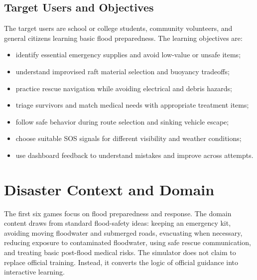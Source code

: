 \documentclass[11pt,a4paper]{article}
\newcommand{\sectionline}{\vspace{0.2em}{\color{ReportBlue}\hrule height 0.8pt}\vspace{0.6em}}
\begin{document}
\subsection{Target Users and Objectives}
The target users are school or college students, community volunteers, and general citizens learning basic flood preparedness. The learning objectives are:
\begin{itemize}
  \item identify essential emergency supplies and avoid low-value or unsafe items;
  \item understand improvised raft material selection and buoyancy tradeoffs;
  \item practice rescue navigation while avoiding electrical and debris hazards;
  \item triage survivors and match medical needs with appropriate treatment items;
  \item follow safe behavior during route selection and sinking vehicle escape;
  \item choose suitable SOS signals for different visibility and weather conditions;
  \item use dashboard feedback to understand mistakes and improve across attempts.
\end{itemize}

\section{Disaster Context and Domain}
\sectionline
The first six games focus on flood preparedness and response. The domain content draws from standard flood-safety ideas: keeping an emergency kit, avoiding moving floodwater and submerged roads, evacuating when necessary, reducing exposure to contaminated floodwater, using safe rescue communication, and treating basic post-flood medical risks. The simulator does not claim to replace official training. Instead, it converts the logic of official guidance into interactive learning.
\end{document}
